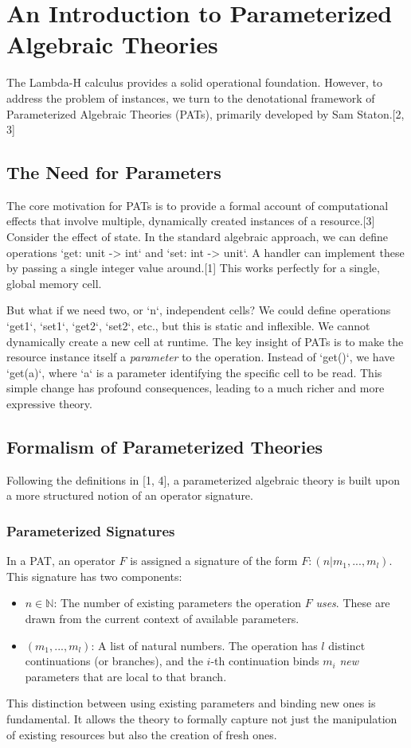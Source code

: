 \documentclass{article}
\begin{document}
\section{An Introduction to Parameterized Algebraic Theories}
The Lambda-H calculus provides a solid operational foundation. However, to address the problem of instances, we turn to the denotational framework of Parameterized Algebraic Theories (PATs), primarily developed by Sam Staton.[2, 3]

\subsection{The Need for Parameters}
The core motivation for PATs is to provide a formal account of computational effects that involve multiple, dynamically created instances of a resource.[3] Consider the effect of state. In the standard algebraic approach, we can define operations `get: unit -> int` and `set: int -> unit`. A handler can implement these by passing a single integer value around.[1] This works perfectly for a single, global memory cell.

But what if we need two, or `n`, independent cells? We could define operations `get1`, `set1`, `get2`, `set2`, etc., but this is static and inflexible. We cannot dynamically create a new cell at runtime. The key insight of PATs is to make the resource instance itself a \emph{parameter} to the operation. Instead of `get()`, we have `get(a)`, where `a` is a parameter identifying the specific cell to be read. This simple change has profound consequences, leading to a much richer and more expressive theory.

\subsection{Formalism of Parameterized Theories}
Following the definitions in [1, 4], a parameterized algebraic theory is built upon a more structured notion of an operator signature.

\subsubsection{Parameterized Signatures}
In a PAT, an operator $F$ is assigned a signature of the form $F:(n|m_{1},...,m_{l})$. This signature has two components:
\begin{itemize}
    \item $n \in \mathbb{N}$: The number of existing parameters the operation $F$ \emph{uses}. These are drawn from the current context of available parameters.
    \item $(m_{1},...,m_{l})$: A list of natural numbers. The operation has $l$ distinct continuations (or branches), and the $i$-th continuation binds $m_i$ \emph{new} parameters that are local to that branch.
\end{itemize}
This distinction between using existing parameters and binding new ones is fundamental. It allows the theory to formally capture not just the manipulation of existing resources but also the creation of fresh ones.
\end{document}
